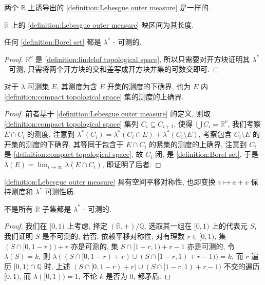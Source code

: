 \begin{corollary}
    两个 \(\mathbb{R}\) 上诱导出的 \ref{definition:Lebesgue outer measure} 是一样的.
\end{corollary}

\begin{lemma}
    \(\mathbb{R}\) 上的 \ref{definition:Lebesgue outer measure} 映区间为其长度.
\end{lemma}

\begin{corollary}
    任何 \ref{definition:Borel set} 都是 \(\lambda^\ast\) - 可测的.

    \begin{proof}
        \(\mathbb{R}^\nu\) 是 \ref{definition:lindelof topological space}, 所以只需要对开方块证明其 \(\lambda^\ast\) - 可测,
        只需将两个开方块的交和差写成开方块并集的可数交即可.
    \end{proof}
\end{corollary}

\begin{lemma}
    对于 \(\lambda\) 可测集 \(E\), 其测度为含 \(E\) 开集的测度的下确界,
    也为 \(E\) 内 \ref{definition:compact topological space} 集的测度的上确界.

    \begin{proof}
        前者基于 \ref{definition:Lebesgue outer measure} 的定义, 则取 \ref{definition:compact topological space} 集列 \(C_i \subseteq C_{i+1}\),
        使得 \(\bigcup C_i = \mathbb{R}^\nu\), 我们考察 \(E \cap C_i\) 的测度, 注意到 \(\lambda^\ast (C_i) = \lambda^\ast (C_i \cap E) + \lambda^\ast (C_i \setminus E)\),
        考察包含 \(C_i \setminus E\) 的开集的测度的下确界, 其等同于包含于 \(E \cap C_i\) 的紧集的测度的上确界, 注意到 \(C_i\) 是 \ref{definition:compact topological space}, 故 \(C_i\) 闭, 
        是 \ref{definition:Borel set}, 于是 \(\lambda (E) = \lim_{i \to \infty} \lambda (E \cap C_i)\), 即证明了后者.
    \end{proof}
\end{lemma}

\begin{remark}
    \ref{definition:Lebesgue outer measure} 具有空间平移对称性, 也即变换 \(v \mapsto a+v\) 保持测度和 \(\lambda^\ast\) 可测性质.
\end{remark}

\begin{lemma}
    不是所有 \(\mathbb{R}\) 子集都是 \(\lambda^\ast\) - 可测的.

    \begin{proof}
        我们在 \([0,1)\) 上考虑, 择定 \((\mathbb{R},+)/\mathbb{Q}\), 选取其一组在 \([0,1)\) 上的代表元 \(S\),
        我们证明 \(S\) 是不可测的, 若否, 依赖平移对称性, 对有理数 \(r \in [0,1)\), 集 \((S \cap [0,1-r)) + r\) 亦是可测的,
        集 \(S \cap [1-r,1) + r - 1\) 亦是可测的, 令 \(\lambda (S) = k\), 则 \(\lambda ((S \cap [0,1-r) + r) \cup (S \cap [1-r,1) + r - 1)) = k\),
        而 \(r\) 遍历 \([0,1) \cap \mathbb{Q}\) 时, 上述 \((S \cap [0,1-r) + r) \cup (S \cap [1-r,1) + r - 1)\) 不交的遍历 \([0,1)\),
        而 \(\lambda ([0,1)) = 1\), 不论 \(k\) 是否为 \(0\), 都矛盾.
    \end{proof}
\end{lemma}

